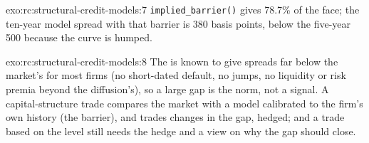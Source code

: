 \begin{solution}{exo:rc:structural-credit-models:7}
\texttt{implied\_barrier()} gives 78.7\% of the face; the ten-year model spread with that
barrier is 380 basis points, below the five-year 500 because the curve is humped.
\end{solution}

\begin{solution}{exo:rc:structural-credit-models:8}
The  is known to give spreads far below the market's for most firms (no
short-dated default, no jumps, no liquidity or risk premia beyond the diffusion's), so a
large gap is the norm, not a signal. A capital-structure trade compares the market with a
model calibrated to the firm's own history (the barrier), and trades changes in the gap,
hedged; and a trade based on the level still needs the hedge and a view on why the gap
should close.
\end{solution}

